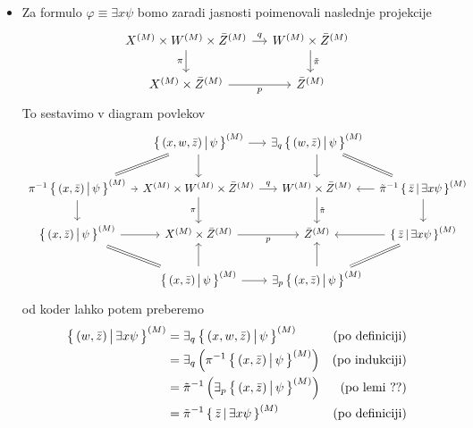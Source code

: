 \documentclass[../kategoricna_logika.tex]{subfiles}
\begin{document}
\begin{dokaz}
\begin{itemize}
      \item 
        Za formulo $\varphi \equiv \exists x \psi$ bomo zaradi jasnosti poimenovali naslednje projekcije
        \begin{equation*}
        \begin{tikzcd}[column sep=small]
          \interp{X} \times \interp{W} \times \interp{\bar{Z}} \ar[d, "\pi"'] \ar[r, "q"] & \interp{W} \times \interp{\bar{Z}} \ar[d, "\tilde{\pi}"] \\
          \interp{X} \times \interp{\bar{Z}} \ar[r, "p"'] & \interp{\bar{Z}}
        \end{tikzcd}
        \end{equation*}
        To sestavimo v diagram povlekov
        {\scriptsize
         \begin{equation*}
         \begin{tikzcd}[column sep=tiny]
          & \setb{(x,w,\bar{z})}{\psi}^{(M)} \ar[dl, equal] \ar[d] \ar[r] & \exists_q \setb{(w,\bar{z})}{\psi}^{(M)} \ar[d] \ar[dr, equal] & \\
          \pi^{-1}\setb{(x,\bar{z})}{\psi}^{(M)} \ar[d] \ar[r] & X^{(M)} \times W^{(M)} \times \bar{Z}^{(M)} \ar[d, "\pi"'] \ar[r, "q"] & W^{(M)} \times \bar{Z}^{(M)} \ar[d, "\tilde{\pi}"] & \tilde{\pi}^{-1} \setb{\bar{z}}{\exists x \psi}^{(M)} \ar[l] \ar[d] \\
          \setb{(x,\bar{z})}{\psi}^{(M)} \ar[dr, equal] \ar[r] & X^{(M)} \times \bar{Z}^{(M)} \ar[r, "p"'] & \bar{Z}^{(M)}  & \setb{\bar{z}}{\exists x \psi}^{(M)} \ar[l] \ar[dl, equal] \\
          & \setb{(x,\bar{z})}{\psi}^{(M)} \ar[u] \ar[r] & \exists_p \setb{(x,\bar{z})}{\psi}^{(M)} \ar[u] &
        \end{tikzcd}
        \end{equation*}
        }
        od koder lahko potem preberemo
        \begin{align*}
          \left\lbrace\, (w, \bar{z}) \,\middle|\, \exists x \psi \,\right\rbrace^{(M)} &= \exists_q \left\lbrace\, (x,w,\bar{z}) \,\middle|\, \psi \,\right\rbrace^{(M)} &\text{(po definiciji)} \\
              &= \exists_q \left( \pi^{-1} \left\lbrace\, (x, \bar{z}) \,\middle|\, \psi \,\right\rbrace^{(M)}\right) &\text{(po indukciji)} \\
              &= \tilde{\pi}^{-1} \left( \exists_p \left\lbrace\, (x,\bar{z}) \,\middle|\, \psi \,\right\rbrace^{(M)} \right) &\text{(po lemi ??)} \\
              &= \tilde{\pi}^{-1} \left\lbrace\, \bar{z} \,\middle|\, \exists x \psi \,\right\rbrace^{(M)} &\text{(po definiciji)}
        \end{align*}
  \end{itemize}
\end{dokaz}
\end{document}
